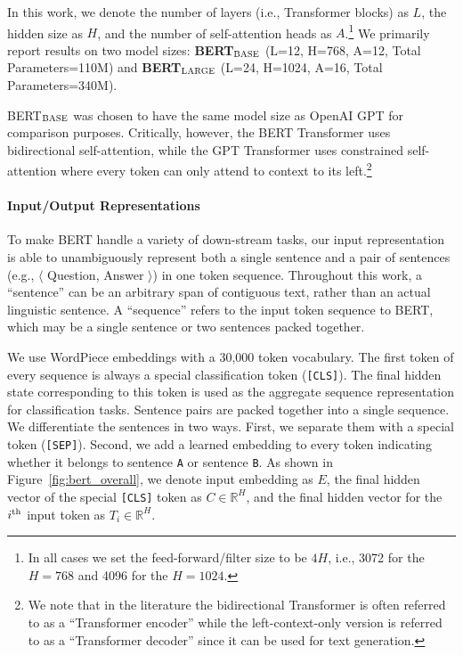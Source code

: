 \documentclass[11pt,a4paper]{article}
\newcommand\bertbase{BERT$_{\small \textsc{BASE}}$\xspace}
\newcommand\bertlarge{BERT$_{\small \textsc{LARGE}}$\xspace}
\begin{document}
In this work, we denote the number of layers (i.e., Transformer blocks) as $L$, the hidden size as $H$, and the number of self-attention heads as $A$.\footnote{In all cases we set the feed-forward/filter size to be $4H$, i.e., 3072 for the $H=768$ and 4096 for the $H=1024$.} We primarily report results on two model sizes: {\bf \bertbase} (L=12, H=768, A=12, Total Parameters=110M) and {\bf \bertlarge} (L=24, H=1024, A=16, Total Parameters=340M).

\bertbase was chosen to have the same model size as OpenAI GPT for comparison purposes. Critically, however, the BERT Transformer uses bidirectional self-attention, while the GPT Transformer uses constrained self-attention where every token can only attend to context to its left.\footnote{We note that in the literature the bidirectional Transformer is often referred to as a ``Transformer encoder'' while the left-context-only version is referred to as a ``Transformer decoder'' since it can be used for text generation.} 


\paragraph{Input/Output Representations} %
To make BERT handle a variety of down-stream tasks,
our input representation is able to unambiguously represent both a single sentence and a pair of  sentences (e.g., $\langle$ Question, Answer $\rangle$) in one token sequence. Throughout this work, a ``sentence'' can be an arbitrary span of contiguous text, rather than an actual linguistic sentence. A ``sequence'' refers to the input token sequence to BERT, which may be a single sentence or two sentences packed together.

We use WordPiece embeddings \cite{wu-etal:2016:_googl} with a 30,000 token vocabulary.
The first token of every sequence is always a special classification token ({\tt [CLS]}). The final hidden state corresponding to this token is used as the aggregate sequence representation for classification tasks. 
Sentence pairs are packed together into a single sequence. We differentiate the sentences in two ways. First, we separate them with a special token ({\tt [SEP]}). Second, we add a learned embedding to every token indicating whether it belongs to sentence {\tt A} or sentence {\tt B}. 
As shown in Figure~\ref{fig:bert_overall}, we denote 
input embedding as $E$, the final hidden vector of the special {\tt [CLS]} token as $C \in \mathbb{R}^{H}$, and the final hidden vector for the $i^{\rm th}$ input token as $T_i \in \mathbb{R}^H$.
\end{document}
